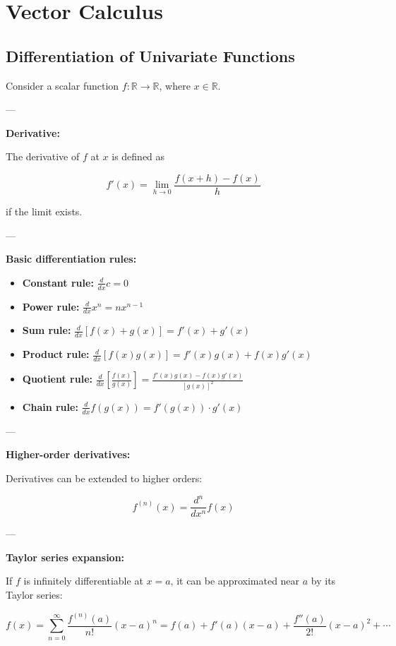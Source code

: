 \section{Vector Calculus}

\subsection{Differentiation of Univariate Functions}

Consider a scalar function \( f: \mathbb{R} \to \mathbb{R} \), where \( x \in \mathbb{R} \).

---

\textbf{Derivative:}

The derivative of \( f \) at \( x \) is defined as

\[
f'(x) = \lim_{h \to 0} \frac{f(x+h) - f(x)}{h}
\]

if the limit exists.

---

\textbf{Basic differentiation rules:}

\begin{itemize}
    \item \textbf{Constant rule:} \(\frac{d}{dx} c = 0\)
    \item \textbf{Power rule:} \(\frac{d}{dx} x^n = n x^{n-1}\)
    \item \textbf{Sum rule:} \(\frac{d}{dx} [f(x) + g(x)] = f'(x) + g'(x)\)
    \item \textbf{Product rule:} \(\frac{d}{dx} [f(x) g(x)] = f'(x) g(x) + f(x) g'(x)\)
    \item \textbf{Quotient rule:} \(\frac{d}{dx} \left[\frac{f(x)}{g(x)}\right] = \frac{f'(x) g(x) - f(x) g'(x)}{[g(x)]^2}\)
    \item \textbf{Chain rule:} \(\frac{d}{dx} f(g(x)) = f'(g(x)) \cdot g'(x)\)
\end{itemize}

---

\textbf{Higher-order derivatives:}

Derivatives can be extended to higher orders:

\[
f^{(n)}(x) = \frac{d^n}{dx^n} f(x)
\]

---

\textbf{Taylor series expansion:}

If \( f \) is infinitely differentiable at \( x = a \), it can be approximated near \( a \) by its Taylor series:

\[
f(x) = \sum_{n=0}^{\infty} \frac{f^{(n)}(a)}{n!} (x - a)^n = f(a) + f'(a)(x - a) + \frac{f''(a)}{2!}(x - a)^2 + \cdots
\]


